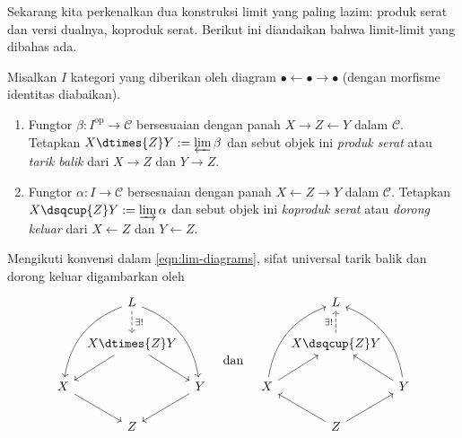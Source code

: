 Sekarang kita perkenalkan dua konstruksi limit yang paling lazim: produk serat dan versi dualnya, koproduk serat. Berikut ini diandaikan bahwa limit-limit yang dibahas ada.
\begin{definition}
	Misalkan $I$ kategori yang diberikan oleh diagram $\bullet \leftarrow \bullet \rightarrow \bullet$ (dengan morfisme identitas diabaikan).
	\begin{enumerate}
		\item Fungtor $\beta: I^\text{op} \to \mathcal{C}$ bersesuaian dengan panah $X \rightarrow Z \leftarrow Y$ dalam $\mathcal{C}$. Tetapkan $X \dtimes{Z} Y := \varprojlim \beta$ dan sebut objek ini \emph{produk serat} atau \emph{tarik balik} dari $X \to Z$ dan $Y \to Z$.
		\item Fungtor $\alpha: I \to \mathcal{C}$ bersesuaian dengan panah $X \leftarrow Z \rightarrow Y$ dalam $\mathcal{C}$. Tetapkan $X \dsqcup{Z} Y := \varinjlim \alpha$ dan sebut objek ini \emph{koproduk serat} atau \emph{dorong keluar} dari $X \leftarrow Z$ dan $Y \leftarrow Z$.
	\end{enumerate}
\end{definition}
Mengikuti konvensi dalam \eqref{eqn:lim-diagrams}, sifat universal tarik balik dan dorong keluar digambarkan oleh
\begin{equation}
	\begin{tikzcd}[column sep=tiny]
		{} & L \arrow[bend left=30, rdd] \arrow[bend right=30, ldd] \arrow[dashed, d, "{\exists !}"] & \\
		& X \dtimes{Z} Y \arrow[rd] \arrow[ld] \\
		X \arrow[rd] & & Y \arrow[ld] \\
	& Z &
	\end{tikzcd} \quad \text{dan} \quad
	\begin{tikzcd}[column sep=tiny]
		{} & L & \\
		& X \dsqcup{Z} Y \arrow[dashed, u, "{\exists !}"] \\
		X \arrow[ru] \arrow[bend left=30, ruu] & & Y \arrow[lu] \arrow[bend right=30, luu] \\
		& Z \arrow[ru] \arrow[lu] &
	\end{tikzcd}
\end{equation}

